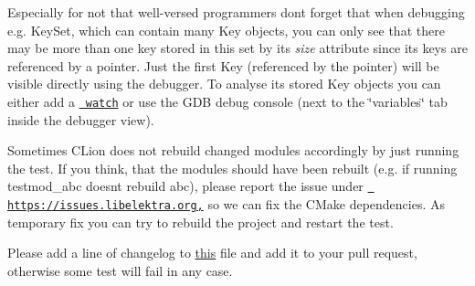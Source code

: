 \begin{DoxyItemize}
\item Especially for not that well-\/versed programmers don\textquotesingle{}t forget that when debugging e.\+g. {\ttfamily Key\+Set}, which can contain many {\ttfamily Key} objects, you can only see that there may be more than one key stored in this set by it\textquotesingle{}s {\itshape size} attribute since it\textquotesingle{}s keys are referenced by a pointer. Just the first {\ttfamily Key} (referenced by the pointer) will be visible directly using the debugger. To analyse it\textquotesingle{}s stored {\ttfamily Key} objects you can either add a \href{https://www.jetbrains.com/help/clion/debug-tool-window-watches.html}{\texttt{ watch}} or use the G\+DB debug console (next to the \char`\"{}variables\char`\"{} tab inside the debugger view).
\item Sometimes C\+Lion does not rebuild changed modules accordingly by just running the test. If you think, that the modules should have been rebuilt (e.\+g. if running {\ttfamily testmod\+\_\+abc} doesn\textquotesingle{}t rebuild abc), please report the issue under \href{https://issues.libelektra.org,}{\texttt{ https\+://issues.\+libelektra.\+org,}} so we can fix the C\+Make dependencies. As temporary fix you can try to rebuild the project and restart the test.
\item Please add a line of changelog to \mbox{\hyperlink{doc_news__preparation_next_release_md}{this}} file and add it to your pull request, otherwise some test will fail in any case. 
\end{DoxyItemize}